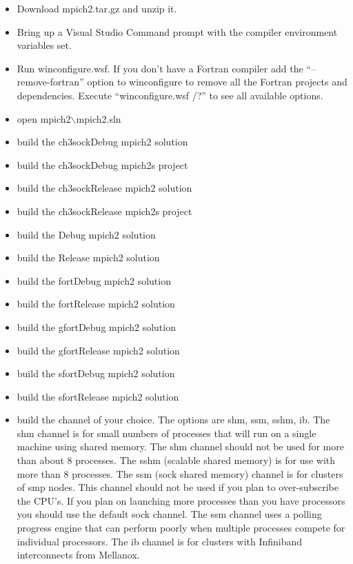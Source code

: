 \documentclass[dvipdfm,11pt]{article}
\begin{document}
\begin{itemize}
\item
Download mpich2.tar.gz and unzip it.
\item
Bring up a Visual Studio Command prompt with the compiler environment 
variables set.
\item
Run winconfigure.wsf. If you don't have a Fortran compiler add the 
``--remove-fortran'' option to winconfigure to remove all the Fortran 
projects and dependencies.  Execute ``winconfigure.wsf /?'' to see all
available options.
\item 
    open mpich2$\backslash$mpich2.sln
\item
    build the ch3sockDebug mpich2 solution
\item
    build the ch3sockDebug mpich2s project
\item
    build the ch3sockRelease mpich2 solution
\item
    build the ch3sockRelease mpich2s project
\item
    build the Debug mpich2 solution
\item
    build the Release mpich2 solution
\item
    build the fortDebug mpich2 solution
\item
    build the fortRelease mpich2 solution
\item
    build the gfortDebug mpich2 solution
\item
    build the gfortRelease mpich2 solution
\item
    build the sfortDebug mpich2 solution
\item
    build the sfortRelease mpich2 solution
\item
    build the channel of your choice.  The options are shm, ssm, sshm, ib.  
The shm channel is for small numbers of processes that will run on a single 
machine using shared memory.  The shm channel should not be used for more 
than about 8 processes.  The sshm (scalable shared memory) is for use with 
more than 8 processes.  The ssm (sock shared memory) channel is for clusters 
of smp nodes.  This channel should not be used if you plan to over-subscribe 
the CPU's.  If you plan on launching more processes than you have processors 
you should use the default sock channel.  The ssm channel uses a polling 
progress engine that can perform poorly when multiple processes compete for 
individual processors.  The ib channel is for clusters with Infiniband
interconnects from Mellanox.

\end{itemize}
\end{document}
